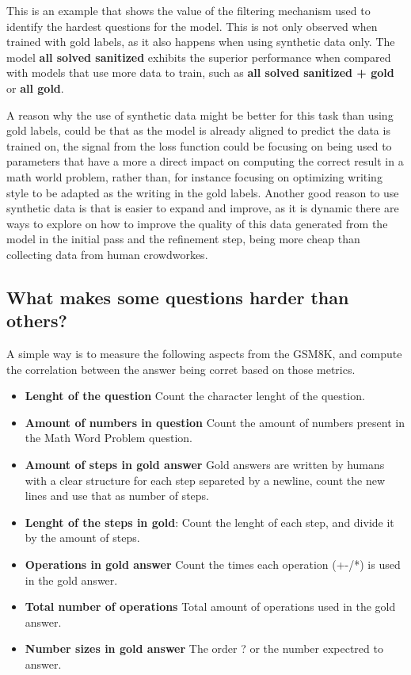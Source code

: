 \documentclass[a4paper,10pt]{article}
\begin{document}
This is an example that shows the value of the filtering mechanism used to identify the hardest questions for the model. This is not only observed when trained with gold labels, as it also happens when using synthetic data only. The model \textbf{all solved sanitized} exhibits the superior performance when compared with models that use more data to train, such as \textbf{all solved sanitized + gold} or \textbf{all gold}.

A reason why the use of synthetic data might be better for this task than using gold labels, could be that as the model is already aligned to predict the data is trained on, the signal from the loss function could be focusing on being used to parameters that have a more a direct impact on computing the correct result in a math world problem, rather than, for instance focusing on optimizing writing style to be adapted as the writing in the gold labels. Another good reason to use synthetic data is that is easier to expand and improve, as it is dynamic there are ways to explore on how to improve the quality of this data generated from the model in the initial pass and the refinement step, being more cheap than collecting data from human crowdworkes. 

\subsection{What makes some questions harder than others?}
A simple way is to measure the following aspects from the GSM8K, and compute the correlation between the answer being corret based on those metrics.

\begin{itemize}
 \item \textbf{Lenght of the question} Count the character lenght of the question.
 \item \textbf{Amount of numbers in question} Count the amount of numbers present in the Math Word Problem question.
 \item \textbf{Amount of steps in gold answer} Gold answers are written by humans with a clear structure for each step separeted by a newline, count the new lines and use that as number of steps.
 \item \textbf{Lenght of the steps in gold}: Count the lenght of each step, and divide it by the amount of steps.
 \item \textbf{Operations in gold answer} Count the times each operation (+-/*) is used in the gold answer.
 \item \textbf{Total number of operations} Total amount of operations used in the gold answer.
 \item \textbf{Number sizes in gold answer} The order ? or the number expectred to answer.
\end{itemize}
\end{document}
